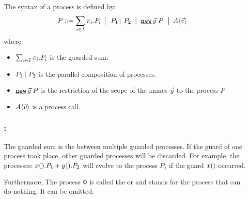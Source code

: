 \begin{definition}
\label{def_process_syntax}
The syntax of a \picalc{} process  is defined by: 
\begin{align*}
 P & \syntdef \procsum \ebnf \procpar{P_1}{P_2} \ebnf \procres{\vec{y}}{P} \ebnf \proccall{A}{\vec{v}}
\end{align*}
where:
\begin{itemize}
\item $\sum_{i\in I}{\pi_i.P_i}$ is the guarded sum.
\item $P_1 \mid P_2$ is the parallel composition of processes.
\item $\procres{\vec{y}}{P}$ is the restriction of the scope of the names $\vec{y}$ to the process $P$
\item $A\langle\vec{v}\rangle$ is a process call. 
\end{itemize}
\end{definition}

\subsubsection{:} The guarded sum is the  between multiple guarded processes. If the guard of one process took place, other guarded processes will be discarded. For example, the processes: $x().P_1 + y().P_2$ will evolve to the process $P_1$ if the guard $x()$ occurred.

Furthermore, The process $\mathbf{0}$ is called the  or  and stands for the process that can do nothing. It can be omitted.
